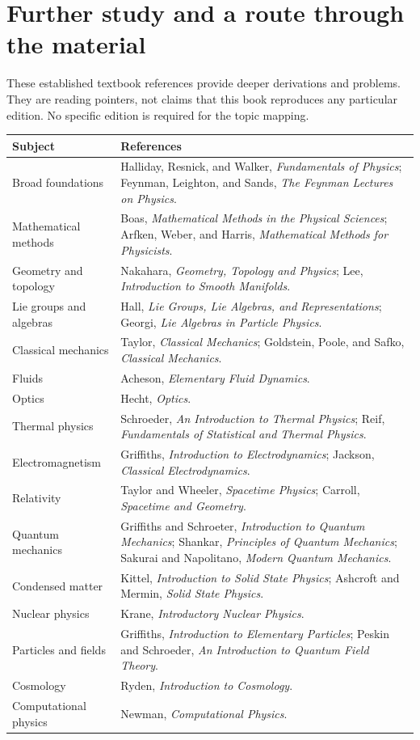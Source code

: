 \documentclass[11pt,oneside]{book}
\theoremstyle{reviewstyle}
\begin{document}
\chapter{Further study and a route through the material}
These established textbook references provide deeper derivations and problems. They are reading pointers, not claims that this book reproduces any particular edition. No specific edition is required for the topic mapping.
\begin{longtable}{p{}p{}}
\toprule
Subject & References\\
\midrule
\endhead
Broad foundations & Halliday, Resnick, and Walker, \emph{Fundamentals of Physics}; Feynman, Leighton, and Sands, \emph{The Feynman Lectures on Physics}.\\
Mathematical methods & Boas, \emph{Mathematical Methods in the Physical Sciences}; Arfken, Weber, and Harris, \emph{Mathematical Methods for Physicists}.\\
Geometry and topology & Nakahara, \emph{Geometry, Topology and Physics}; Lee, \emph{Introduction to Smooth Manifolds}.\\
Lie groups and algebras & Hall, \emph{Lie Groups, Lie Algebras, and Representations}; Georgi, \emph{Lie Algebras in Particle Physics}.\\
Classical mechanics & Taylor, \emph{Classical Mechanics}; Goldstein, Poole, and Safko, \emph{Classical Mechanics}.\\
Fluids & Acheson, \emph{Elementary Fluid Dynamics}.\\
Optics & Hecht, \emph{Optics}.\\
Thermal physics & Schroeder, \emph{An Introduction to Thermal Physics}; Reif, \emph{Fundamentals of Statistical and Thermal Physics}.\\
Electromagnetism & Griffiths, \emph{Introduction to Electrodynamics}; Jackson, \emph{Classical Electrodynamics}.\\
Relativity & Taylor and Wheeler, \emph{Spacetime Physics}; Carroll, \emph{Spacetime and Geometry}.\\
Quantum mechanics & Griffiths and Schroeter, \emph{Introduction to Quantum Mechanics}; Shankar, \emph{Principles of Quantum Mechanics}; Sakurai and Napolitano, \emph{Modern Quantum Mechanics}.\\
Condensed matter & Kittel, \emph{Introduction to Solid State Physics}; Ashcroft and Mermin, \emph{Solid State Physics}.\\
Nuclear physics & Krane, \emph{Introductory Nuclear Physics}.\\
Particles and fields & Griffiths, \emph{Introduction to Elementary Particles}; Peskin and Schroeder, \emph{An Introduction to Quantum Field Theory}.\\
Cosmology & Ryden, \emph{Introduction to Cosmology}.\\
Computational physics & Newman, \emph{Computational Physics}.\\
\bottomrule
\end{longtable}
\end{document}
